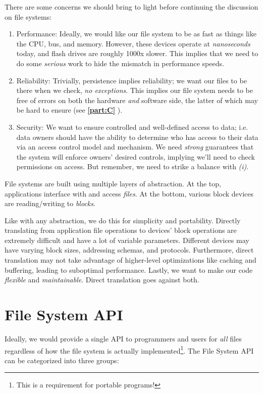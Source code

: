 \documentclass{report}
\newcommand{\abstractionBegin}[1]{\begin{tcolorbox}[colback=violet!5!white,colframe=violet,title={Abstraction:
      #1}]}
\newcommand{\abstractionEnd}{\end{tcolorbox}}
\newcommand{\asideBegin}[1]{\begin{tcolorbox}[colback=orange!5!white,colframe=black!75!orange,title={Aside:
      #1}]}
\newcommand{\asideEnd}{\end{tcolorbox}}
\newcommand{\refto}[2]{\textbf{\ref{#1:#2} \nameref{#1:#2}}}
\begin{document}
\asideBegin{Issues}
There are some concerns we should bring to light before continuing the discussion on file systems:

\begin{enumerate}[label=\textit{(\roman*)}]
\item Performance: Ideally, we would like our file system to be as fast as things like the CPU, bus,
  and memory. However, these devices operate at \textit{nanoseconds} today, and flash drives are
  roughly 1000x slower. This implies that we need to do some \textit{serious} work to hide the
  mismatch in performance speeds.
\item Reliability: Trivially, persistence implies reliability; we want our files to be there when we
  check, \textit{no exceptions}. This implies our file system needs to be free of errors on both the
  hardware \textit{and} software side, the latter of which may be hard to ensure (see
  \refto{part}{C}).
\item Security: We want to ensure controlled and well-defined access to data; i.e. data owners
  should have the ability to determine who has access to their data via an access control model and
  mechanism. We need \textit{strong} guarantees that the system will enforce owners' desired
  controls, implying we'll need to check permissions on access. But remember, we need to strike a
  balance with \textit{(i)}. 
\end{enumerate}
\asideEnd

File systems are built using multiple layers of abstraction. At the top, applications interface with
and access \textit{files}. At the bottom, various block devices are reading/writing to
\textit{blocks}.

\abstractionBegin{File Systems}
Like with any abstraction, we do this for simplicity and portability. Directly translating from
application file operations to devices' block operations are extremely difficult and have a lot of
variable parameters. Different devices may have varying block sizes, addressing schemas, and
protocols. Furthermore, direct translation may not take advantage of higher-level optimizations like
caching and buffering, leading to suboptimal performance. Lastly, we want to make our code
\textit{flexible} and \textit{maintainable}. Direct translation goes against both.
\abstractionEnd


\section{File System API}
\label{sec:FSA}
Ideally, we would provide a single API to programmers and users for \textit{all} files regardless of
how the file system is actually implemented\footnote{This is a requirement for portable
  programs!}. The File System API can be categorized into three groups:
\end{document}
